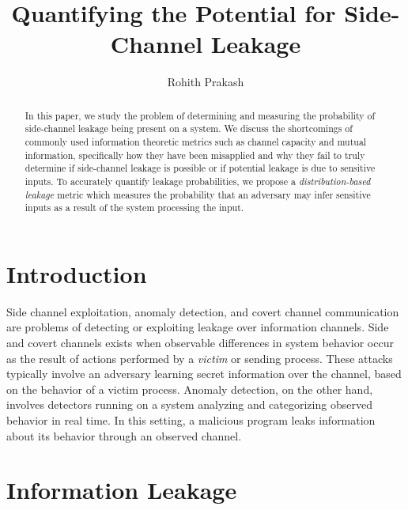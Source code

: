 \documentclass[a4paper]{article}
\title{Quantifying the Potential for Side-Channel Leakage}
\author{Rohith Prakash}
\date{}
\theoremstyle{def}
\theoremstyle{thm}
\begin{document}
\maketitle{}

\begin{abstract}
    In this paper, we study the problem of determining and measuring the probability of side-channel leakage being present on a system.
    We discuss the shortcomings of commonly used information theoretic metrics such as channel capacity and mutual information, specifically how they have been misapplied and why they fail to truly determine if side-channel leakage is possible or if potential leakage is due to sensitive inputs.
    To accurately quantify leakage probabilities, we propose a \textit{distribution-based leakage} metric which measures the probability that an adversary may infer sensitive inputs as a result of the system processing the input.
\end{abstract}

\section{Introduction}
\label{sec:intro}



Side channel exploitation, anomaly detection, and covert channel communication are problems of detecting or exploiting leakage over information channels.
Side and covert channels exists when observable differences in system behavior occur as the result of actions performed by a \textit{victim} or sending process.
These attacks typically involve an adversary learning secret information over the channel, based on the behavior of a victim process.
Anomaly detection, on the other hand, involves detectors running on a system analyzing and categorizing observed behavior in real time.
In this setting, a malicious program leaks information about its behavior through an observed channel.

\section{Information Leakage}
\label{sec:information_leakage}
\end{document}
